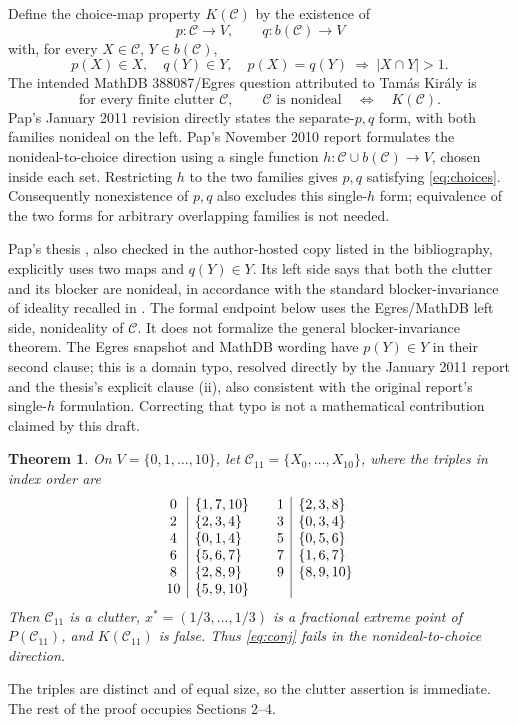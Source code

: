 \documentclass[11pt]{article}
\newtheorem{theorem}{Theorem}
\newcommand{\C}{\mathcal C}
\begin{document}
Define the choice-map property $K(\C)$ by the existence of
\[
 p:\C\longrightarrow V,\qquad q:b(\C)\longrightarrow V
\]
with, for every $X\in\C$, $Y\in b(\C)$,
\begin{equation}\label{eq:choices}
 p(X)\in X,\quad q(Y)\in Y,\quad
 p(X)=q(Y)\ \Longrightarrow\ |X\cap Y|>1.
\end{equation}
The intended MathDB 388087/Egres question attributed to Tam\'as Kir\'aly is
\begin{equation}\label{eq:conj}
 \text{for every finite clutter }\C,\qquad
 \C\text{ is nonideal}\quad\Longleftrightarrow\quad K(\C).
\end{equation}
Pap's January 2011 revision \cite[Conjecture 1.2, p.~1]{PapRevised} directly states the separate-$p,q$ form, with both families nonideal on the left. Pap's November 2010 report \cite[Definition 1.1 and Conjecture 1.2, p.~1]{PapTR} formulates the nonideal-to-choice direction using a single function $h:\C\cup b(\C)\to V$, chosen inside each set. Restricting $h$ to the two families gives $p,q$ satisfying \eqref{eq:choices}. Consequently nonexistence of $p,q$ also excludes this single-$h$ form; equivalence of the two forms for arbitrary overlapping families is not needed.

Pap's thesis \cite[Conjecture 3.4.5, pp.~70--71]{PapThesis}, also checked in the author-hosted copy listed in the bibliography, explicitly uses two maps and $q(Y)\in Y$. Its left side says that both the clutter and its blocker are nonideal, in accordance with the standard blocker-invariance of ideality recalled in \cite[p.~1]{PapTR}. The formal endpoint below uses the Egres/MathDB left side, nonideality of $\C$. It does not formalize the general blocker-invariance theorem. The Egres snapshot \cite{Egres} and MathDB wording have $p(Y)\in Y$ in their second clause; this is a domain typo, resolved directly by the January 2011 report and the thesis's explicit clause (ii), also consistent with the original report's single-$h$ formulation. Correcting that typo is not a mathematical contribution claimed by this draft.

\begin{theorem}\label{thm:main}
On $V=\{0,1,\ldots,10\}$, let $\C_{11}=\{X_0,\ldots,X_{10}\}$, where the triples in index order are
\[
\begin{array}{c|l@{\qquad}c|l}
0&\{1,7,10\}&1&\{2,3,8\}\\
2&\{2,3,4\}&3&\{0,3,4\}\\
4&\{0,1,4\}&5&\{0,5,6\}\\
6&\{5,6,7\}&7&\{1,6,7\}\\
8&\{2,8,9\}&9&\{8,9,10\}\\
10&\{5,9,10\}&&
\end{array}
\]
Then $\C_{11}$ is a clutter, $x^*=(1/3,\ldots,1/3)$ is a fractional extreme point of $P(\C_{11})$, and $K(\C_{11})$ is false. Thus \eqref{eq:conj} fails in the nonideal-to-choice direction.
\end{theorem}
The triples are distinct and of equal size, so the clutter assertion is immediate. The rest of the proof occupies Sections 2--4.
\end{document}
